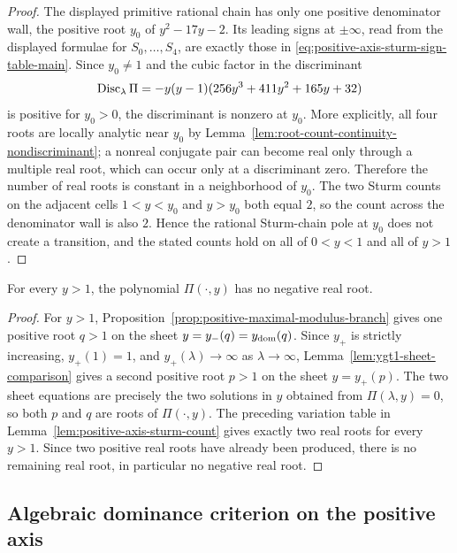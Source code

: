 \begin{proof}
The displayed primitive rational chain has only one positive denominator wall, the positive root \(y_0\) of \(y^2-17y-2\).  Its leading signs at \(\pm\infty\), read from the displayed formulae for \(S_0,\ldots,S_4\), are exactly those in \eqref{eq:positive-axis-sturm-sign-table-main}.  Since \(y_0\ne1\) and the cubic factor in the discriminant
\[
\operatorname{Disc}_\lambda\Pi=-y(y-1)(256y^3+411y^2+165y+32)
\]
is positive for \(y_0>0\), the discriminant is nonzero at \(y_0\).  More explicitly, all four roots are locally analytic near \(y_0\) by Lemma~\ref{lem:root-count-continuity-nondiscriminant}; a nonreal conjugate pair can become real only through a multiple real root, which can occur only at a discriminant zero.  Therefore the number of real roots is constant in a neighborhood of \(y_0\).  The two Sturm counts on the adjacent cells \(1<y<y_0\) and \(y>y_0\) both equal \(2\), so the count across the denominator wall is also \(2\).  Hence the rational Sturm-chain pole at \(y_0\) does not create a transition, and the stated counts hold on all of \(0<y<1\) and all of \(y>1\).
\end{proof}

\begin{lemma}\label{lem:ygt1-no-negative-roots}
For every $y>1$, the polynomial $\Pi(\cdot,y)$ has no negative real root.
\end{lemma}
\begin{proof}
For $y>1$, Proposition~\ref{prop:positive-maximal-modulus-branch} gives one positive root
$q>1$ on the sheet $y=y_-(q)=y_{\rm dom}(q)$.  Since $y_+$ is strictly increasing,
$y_+(1)=1$, and $y_+(\lambda)\to\infty$ as $\lambda\to\infty$, Lemma~\ref{lem:ygt1-sheet-comparison}
gives a second positive root $p>1$ on the sheet $y=y_+(p)$.  The two sheet equations are precisely
the two solutions in $y$ obtained from $\Pi(\lambda,y)=0$, so both $p$ and $q$ are roots of
$\Pi(\cdot,y)$.  The preceding variation table in Lemma~\ref{lem:positive-axis-sturm-count} gives
exactly two real roots for every $y>1$.  Since two positive real roots have already been produced,
there is no remaining real root, in particular no negative real root.
\end{proof}

\subsection{Algebraic dominance criterion on the positive axis}\label{subsec:positive-axis-dominance}

